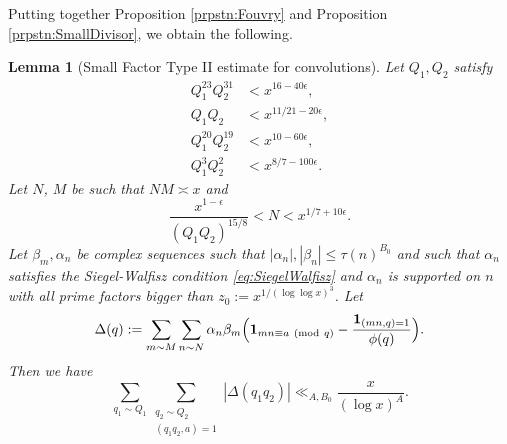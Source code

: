 \documentclass[10pt]{amsart}
\theoremstyle{plain}
\newtheorem{lmm}[thrm]{Lemma}
\numberwithin{equation}{section}
\newcommand{\Mod}[1]{\ (\mathrm{mod}\ #1)}
\begin{document}
%
%
%
%
%
%
%
%
Putting together Proposition \ref{prpstn:Fouvry} and Proposition \ref{prpstn:SmallDivisor}, we obtain the following.
%
%
%
%
%
%
%
%
\begin{lmm}[Small Factor Type II estimate for convolutions]\label{lmm:SmallTypeII}
Let $Q_1,Q_2$ satisfy
\begin{align*}
Q_1^{23}Q_2^{31}&<x^{16-40\epsilon},\\
Q_1Q_2&<x^{11/21-20\epsilon},\\
Q_1^{20}Q_2^{19}&<x^{10-60\epsilon},\\
Q_1^3Q_2^2&<x^{8/7-100\epsilon}.
\end{align*}
Let $N$, $M$ be such that $NM\asymp x$  and 
\[
\frac{x^{1-\epsilon}}{(Q_1Q_2)^{15/8}}<N<x^{1/7+10\epsilon}.
\]
Let $\beta_m,\alpha_n$ be complex sequences such that $|\alpha_n|,|\beta_n|\le \tau(n)^{B_0}$ and such that $\alpha_{n}$ satisfies the Siegel-Walfisz condition \eqref{eq:SiegelWalfisz} and $\alpha_n$ is supported on $n$ with all prime factors bigger than $z_0:=x^{1/(\log\log{x})^3}$. Let
\[
\Delta(q):=\sum_{m\sim M}\sum_{\substack{n\sim N}}\alpha_n\beta_m\Bigl(\mathbf{1}_{m n\equiv a \Mod{q}}-\frac{\mathbf{1}_{(m n,q)=1}}{\phi(q)}\Bigr).
\]
Then we have
\[
\sum_{q_1\sim Q_1}\sum_{\substack{ q_2\sim Q_2\\ (q_1q_2,a)=1}}|\Delta(q_1q_2)|\ll_{A,B_0} \frac{x}{(\log{x})^A}.
\]
\end{lmm}
%
%
%
%
%
%
%
%
\end{document}
